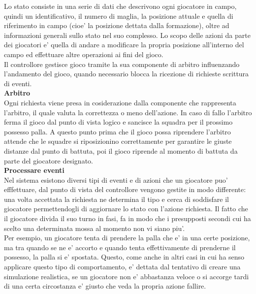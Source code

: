 Lo stato consiste in una serie di dati che descrivono ogni giocatore in campo, quindi un identificativo, il numero di maglia, la posizione attuale e quella di riferimento in campo (cioe' la posizione dettata dalla formazione), oltre ad informazioni generali sullo stato nel suo complesso. Lo scopo delle azioni da parte dei giocatori e' quella di andare a modificare la propria posizione all'interno del campo ed effettuare altre operazioni ai fini del gioco.\\

Il controllore gestisce gioco tramite la sua componente di arbitro influenzando l'andamento  del gioco, quando necessario blocca la ricezione di richieste scrittura di eventi.\\

\textbf{Arbitro}\\

Ogni richiesta viene presa in cosiderazione dalla componente che rappresenta l'arbitro, il quale valuta la correttezza o meno dell'azione. In caso di fallo l'arbitro ferma il gioco dal punto di vista logico e sancisce la squadra per il prossimo possesso palla. A questo punto prima che il gioco possa riprendere l'arbitro attende che le squadre si riposizionino correttamente per garantire le giuste distanze dal punto di battuta, poi il gioco riprende al momento di battuta da parte del giocatore designato.\\

\textbf{Processare eventi}\\

Nel sistema esistono diversi tipi di eventi e di azioni che un giocatore puo' efffettuare, dal punto di vista del controllore vengono gestite in modo differente: una volta accettata la richiesta ne determina il tipo e cerca di soddisfare il giocatore permettendogli di aggiornare lo stato con l'azione richiesta. Il fatto che il giocatore divida il suo turno in fasi, fa in modo che i presupposti secondi cui ha scelto una determinata mossa al momento non vi siano piu'.\\

Per esempio, un giocatore tenta di prendere la palla che e' in una certe posizione, ma tra quando se ne e' accorto e quando tenta effettivamente di prenderne il possesso, la palla si e' spostata. Questo, come anche in altri casi in cui ha senso applicare questo tipo di comportamento, e' dettata dal tentativo di creare una simulazione realistica, se un giocatore non e' abbastanza veloce o si accorge tardi di una certa circostanza e' giusto che veda la propria azione fallire.\\

